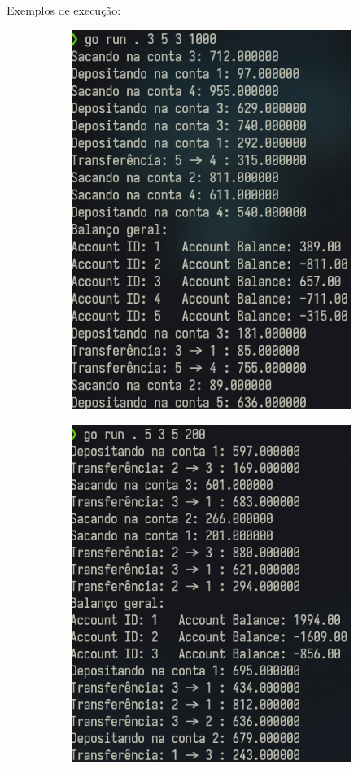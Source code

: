 \documentclass{article}
\begin{document}
Exemplos de execução:
\begin{figure}[H]
	\begin{subfigure}{.48\textwidth}
		\centering
		\includegraphics[scale=0.50]{1.png}
	\end{subfigure}
	\begin{subfigure}{.48\textwidth}
		\centering
		\includegraphics[scale=0.50]{2.png}
	\end{subfigure}
\end{figure}
\end{document}
